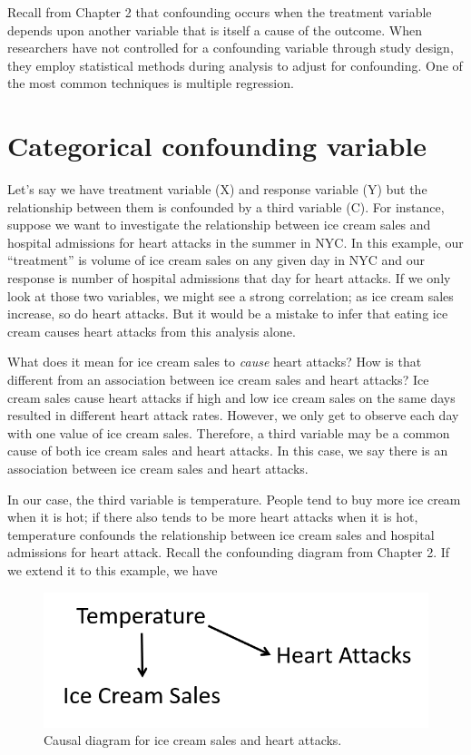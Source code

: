 \documentclass[
]{book}
\begin{document}
Recall from Chapter 2 that confounding occurs when the treatment variable depends upon another variable that is itself a cause of the outcome. When researchers have not controlled for a confounding variable through study design, they employ statistical methods during analysis to adjust for confounding. One of the most common techniques is multiple regression.

\hypertarget{categorical-confounding-variable}{%
\section{Categorical confounding variable}\label{categorical-confounding-variable}}

Let's say we have treatment variable (X) and response variable (Y) but the relationship between them is confounded by a third variable (C). For instance, suppose we want to investigate the relationship between ice cream sales and hospital admissions for heart attacks in the summer in NYC. In this example, our ``treatment'' is volume of ice cream sales on any given day in NYC and our response is number of hospital admissions that day for heart attacks. If we only look at those two variables, we might see a strong correlation; as ice cream sales increase, so do heart attacks. But it would be a mistake to infer that eating ice cream causes heart attacks from this analysis alone.

What does it mean for ice cream sales to \emph{cause} heart attacks? How is that different from an association between ice cream sales and heart attacks? Ice cream sales cause heart attacks if high and low ice cream sales on the same days resulted in different heart attack rates. However, we only get to observe each day with one value of ice cream sales. Therefore, a third variable may be a common cause of both ice cream sales and heart attacks. In this case, we say there is an association between ice cream sales and heart attacks.

In our case, the third variable is temperature. People tend to buy more ice cream when it is hot; if there also tends to be more heart attacks when it is hot, temperature confounds the relationship between ice cream sales and hospital admissions for heart attack. Recall the confounding diagram from Chapter 2. If we extend it to this example, we have

\begin{figure}
\centering
\includegraphics{./images/ice_cream_graph.png}
\caption{Causal diagram for ice cream sales and heart attacks.}
\end{figure}
\end{document}
